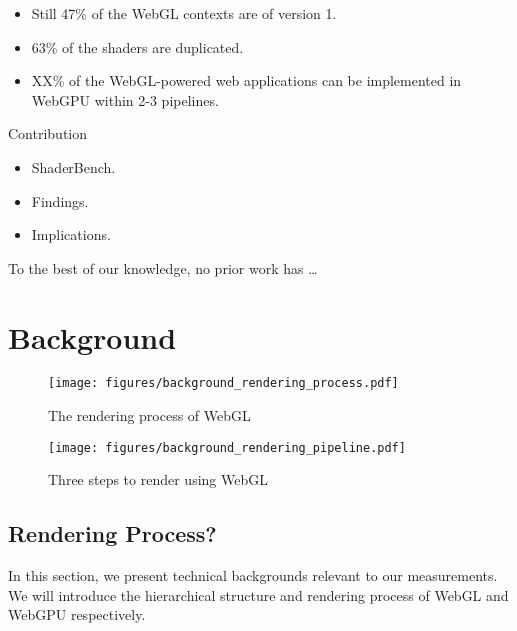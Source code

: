 {\begin{itemize}
    \item Still 47\% of the WebGL contexts are of version 1.
    \item 63\% of the shaders are duplicated.
    \item XX\% of the WebGL-powered web applications can be implemented in WebGPU within 2-3 pipelines.
\end{itemize}



Contribution

\begin{itemize}
    \item ShaderBench.
    \item Findings.
    \item Implications.
\end{itemize}

To the best of our knowledge, no prior work has \dots
}
\section{Background}



\begin{figure}[tp]
\centering
\texttt{[image: figures/background\_rendering\_process.pdf]}
\caption{The rendering process of WebGL}\label{fig_rendering_process}
\end{figure}

\begin{figure}[tp]
\centering
\texttt{[image: figures/background\_rendering\_pipeline.pdf]}
\caption{Three steps to render using WebGL}\label{fig_rendering_pipeline}
\end{figure}

\subsection{Rendering Process?}


In this section, we present technical backgrounds relevant to our measurements. We will introduce the hierarchical structure and rendering process of WebGL and WebGPU respectively.

